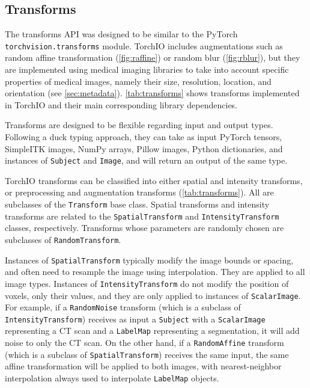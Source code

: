 \subsection{Transforms}
\label{sec:transforms}

The transforms \ac{API} was designed to be similar to the PyTorch
\linebreak
\texttt{torchvision.transforms} module.
%
TorchIO includes augmentations such as
random affine transformation (\cref{fig:raffine})
or random blur (\cref{fig:rblur}),
but they are implemented using medical imaging
libraries \cite{lowekamp_design_2013,brett_nipynibabel_2020}
to take into account specific properties of medical images,
namely their size, resolution, location, and orientation (see \cref{sec:metadata}).
%
\cref{tab:transforms} shows transforms implemented in TorchIO \torchioversion
and their main corresponding library dependencies.





Transforms are designed to be flexible regarding input and output types.
%
Following a duck typing approach,
they can take as input
PyTorch tensors,
SimpleITK images,
NumPy arrays,
Pillow images,
Python dictionaries,
and instances of
\texttt{Subject}
and \texttt{Image},
and will return an output of the same type.


TorchIO transforms can be classified into either spatial and intensity transforms,
or preprocessing and augmentation transforms (\cref{tab:transforms}).
%
All are subclasses of the \texttt{Transform} base class.
%
Spatial transforms and intensity transforms are related to the
\texttt{SpatialTransform} and \texttt{IntensityTransform} classes, respectively.
%
Transforms whose parameters are randomly chosen are subclasses of \texttt{RandomTransform}.


Instances of \texttt{SpatialTransform} typically modify the image bounds or spacing, and often need
to resample the image using interpolation.
%
They are applied to all image types.
%
Instances of \texttt{IntensityTransform} do not modify the position of voxels, only their values,
and they are only applied to instances of \texttt{ScalarImage}.
%
For example, if a \texttt{RandomNoise} transform
(which is a subclass of
\texttt{IntensityTransform})
receives as input
a \texttt{Subject} with a \texttt{ScalarImage} representing
a \ac{CT} scan and a \texttt{LabelMap} representing a segmentation,
it will add noise to only the \ac{CT} scan.
%
On the other hand, if a \texttt{RandomAffine} transform
(which is a subclass of \texttt{SpatialTransform}) receives the same input,
the same affine transformation will be applied to both images,
with nearest-neighbor interpolation always used to interpolate
\texttt{LabelMap} objects.

